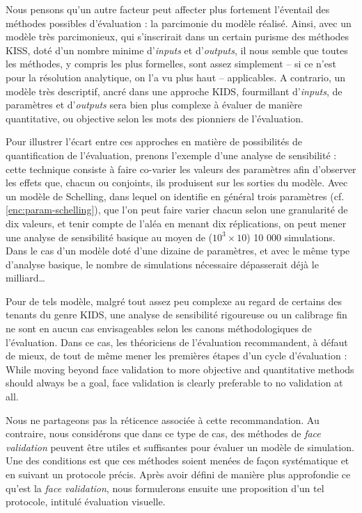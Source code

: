 Nous pensons qu'un autre facteur peut affecter plus fortement l'éventail des méthodes possibles d'évaluation : la parcimonie du modèle réalisé.
Ainsi, avec un modèle très parcimonieux, qui s'inscrirait dans un certain purisme des méthodes \og KISS\fg{}, doté d'un nombre minime d'\textit{inputs} et d'\textit{outputs}, il nous semble que toutes les méthodes, y compris les plus formelles, sont assez simplement -- si ce n'est pour la résolution analytique, on l'a vu plus haut -- applicables.
A contrario, un modèle très descriptif, ancré dans une approche \og KIDS\fg{}, fourmillant d'\textit{inputs}, de paramètres et d'\textit{outputs} sera bien plus complexe à évaluer de manière quantitative, ou \og objective\fg{} selon les mots des pionniers de l'évaluation.

Pour illustrer l'écart entre ces approches en matière de possibilités de quantification de l'évaluation, prenons l'exemple d'une analyse de sensibilité :
	cette technique consiste à faire co-varier les valeurs des paramètres afin d'observer les effets que, chacun ou conjoints, ils produisent sur les sorties du modèle.
Avec un modèle de Schelling, dans lequel on identifie en général trois paramètres (cf. \cref{enc:param-schelling}), que l'on peut faire varier chacun selon une granularité de dix valeurs, et tenir compte de l'aléa en menant dix réplications, on peut mener une analyse de sensibilité basique au moyen de ($10^3 \times 10$) 10 000 simulations.
Dans le cas d'un modèle doté d'une dizaine de paramètres, et avec le même type d'analyse basique, le nombre de simulations nécessaire dépasserait déjà le milliard\ldots

Pour de tels modèle, malgré tout assez peu complexe au regard de certains des tenants du genre KIDS, une analyse de sensibilité rigoureuse ou un calibrage fin ne sont en aucun cas envisageables selon les canons méthodologiques de l'évaluation.
Dans ce cas, les théoriciens de l'évaluation recommandent, à défaut de mieux, de tout de même mener les premières étapes d'un cycle d'évaluation \autocite[342]{petty2010verification} :
	\og While moving beyond face validation to more objective and quantitative methods should always be a goal, face validation is clearly preferable to no validation at all.\fg{}

Nous ne partageons pas la réticence associée à cette recommandation.
Au contraire, nous considérons que dans ce type de cas, des méthodes de \og \textit{face validation}\fg{} peuvent être utiles et suffisantes pour évaluer un modèle de simulation.
Une des conditions est que ces méthodes soient menées de façon systématique et en suivant un protocole précis.
Après avoir défini de manière plus approfondie ce qu'est la \textit{face validation}, nous formulerons ensuite une proposition d'un tel protocole, intitulé \og évaluation visuelle\fg{}.


